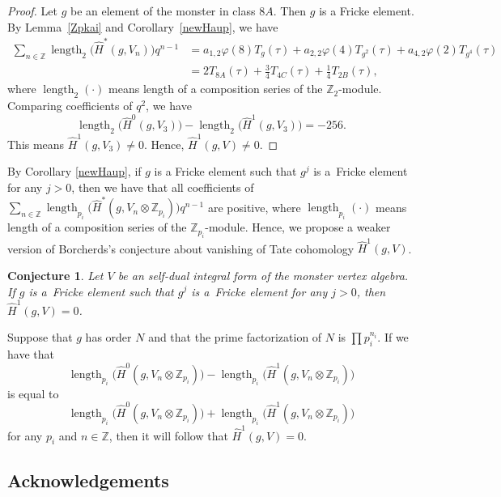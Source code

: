 \documentclass[pdftex]{sigma}%
\numberwithin{equation}{section}
\newtheorem{Conjecture}[Theorem]{Conjecture}
\begin{document}
\begin{proof}
Let $g$ be an element of the monster in class $8A$. Then $g$ is a Fricke element. By Lemma~\ref{Zpkai} and Corollary~\ref{newHaup}, we have
\begin{align*}
\sum_{n \in \mathbb{Z}}\operatorname{length}_2\big(\hat{H}^*(g,V_n)\big)q^{n-1} &=a_{1,2}\varphi(8)T_g(\tau)+a_{2,2}\varphi(4)T_{g^2}(\tau)+a_{4,2}\varphi(2)T_{g^4}(\tau) \\
 &= 2T_{8A}(\tau)+\frac{3}{4}T_{4C}(\tau)+\frac{1}{4}T_{2B}(\tau),
\end{align*}
where $\operatorname{length}_2(\cdot)$ means length of a composition series of the $\mathbb{Z}_2$-module.
Comparing coefficients of $q^2$, we have
\[
\operatorname{length}_2\big(\hat{H}^0(g,V_3)\big)-\operatorname{length}_2\big(\hat{H}^1(g,V_3)\big)=-256.
\]
This means $\hat{H}^1(g,V_3)\neq 0$. Hence, $\hat{H}^1(g,V)\neq 0$.
\end{proof}

 By Corollary \ref{newHaup}, if $g$ is a Fricke element such that $g^j$ is a~Fricke element for any $j> 0$, then we have that all coefficients of $\sum_{n\in \mathbb{Z}}\operatorname{length}_{p_i}\big(\hat{H}^*(g,V_n\otimes \mathbb{Z}_{p_i})\big)q^{n-1}$ are positive, where $\operatorname{length}_{p_i}(\cdot)$ means length of a composition series of the $\mathbb{Z}_{p_i}$-module. Hence, we propose a weaker version of Borcherds's conjecture about vanishing of Tate cohomology $\hat{H}^1(g,V)$.

\begin{Conjecture}
Let $V$ be an self-dual integral form of the monster vertex algebra. If $g$ is a~Fricke element such that $g^j$ is a~Fricke element for any $j> 0$, then $\hat{H}^1(g,V)=0$.
\end{Conjecture}

 Suppose that $g$ has order $N$ and that the prime factorization of $N$ is $\prod p_i^{n_i}$. If we have that
\[
\operatorname{length}_{p_i}\big(\hat{H}^0(g,V_n\otimes\mathbb{Z}_{p_i})\big)-\operatorname{length}_{p_i}\big(\hat{H}^1(g,V_n\otimes\mathbb{Z}_{p_i})\big)
\]
 is equal to
\[
\operatorname{length}_{p_i}\big(\hat{H}^0(g,V_n\otimes\mathbb{Z}_{p_i})\big)+\operatorname{length}_{p_i}\big(\hat{H}^1(g,V_n\otimes\mathbb{Z}_{p_i})\big)
\]
for any $p_i$ and $n\in \mathbb{Z}$, then it will follow that $\hat{H}^1(g,V)=0$.

\subsection*{Acknowledgements}
\end{document}
